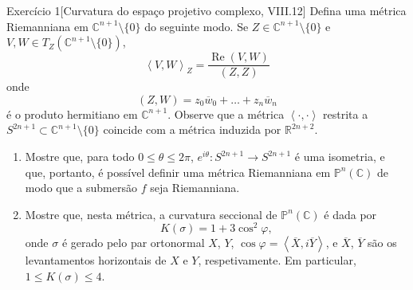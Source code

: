 \begin{thing6}{Exercício 1}[Curvatura do espaço projetivo complexo, \cite{doc} VIII.12]\label{exer:1}\leavevmode
Defina uma métrica Riemanniana  em \(\mathbb{C}^{n+1}\setminus\{0\}\) do seguinte modo. Se \(Z \in \mathbb{C}^{n+1}\setminus\{0\}\) e \(V,W \in T_Z (\mathbb{C}^{n+1}\setminus\{0\})\),
\[\left<V,W\right>_Z=\frac{\operatorname{Re}(V,W)}{(Z,Z)}\]
onde 
\[(Z,W)=z_0\overline{w}_0+\ldots+z_n\overline{w}_n\]
é o produto hermitiano em \(\mathbb{C}^{n+1}\). Observe que a métrica \(\left<\cdot,\cdot\right>\) restrita a \(S^{2n+1}\subset \mathbb{C}^{n+1}\setminus\{0\}\) coincide com a métrica induzida por \(\mathbb{R}^{2n+2}\).
\begin{enumerate}[label=(\alph*)]
\item Mostre que, para todo \(0\leq \theta \leq 2\pi\), \(e^{i\theta}:S^{2n+1}\to S^{2n+1}\) é uma isometria, e que, portanto, é possível definir uma métrica Riemanniana em \(\mathbb{P}^n(\mathbb{C})\) de modo que a submersão \(f\) seja Riemanniana.

\item Mostre que, nesta métrica, a curvatura seccional de \(\mathbb{P}^n(\mathbb{C})\) é dada por
	\[K(\sigma)=1+3\cos^2\varphi,\]
onde \(\sigma\) é gerado pelo par ortonormal \(X\), \(Y\), \(\cos \varphi=\left<\overline{X},i\overline{Y}\right>\), e \(\overline{X}\), \(\overline{Y}\) são os levantamentos horizontais de \(X\) e \(Y\), respetivamente. Em particular, \(1 \leq  K(\sigma) \leq  4\).
\end{enumerate}
\end{thing6}

